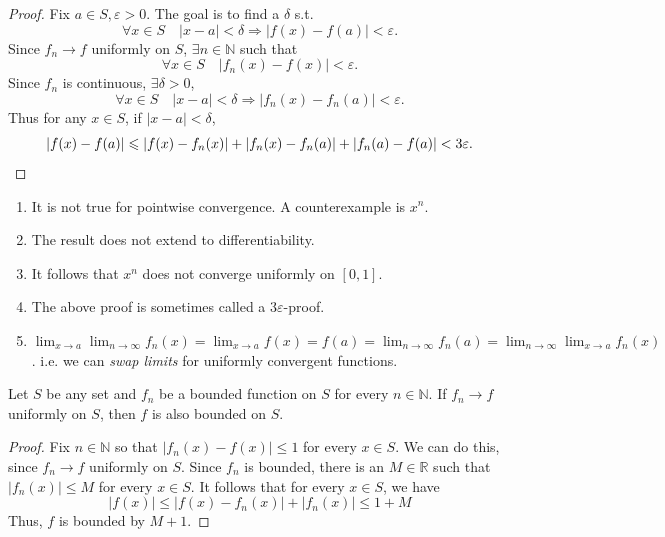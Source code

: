 \documentclass[a4paper,11pt]{article}
\renewcommand{\epsilon}{\varepsilon}
\begin{document}
\begin{proof}
    Fix $ a\in S, \epsilon>0 $. The goal is to find a $ \delta $ s.t. 
    \[
        \forall x\in S\quad |x-a|<\delta \Longrightarrow |f(x)-f(a)|<\epsilon.
    \]
    Since $ f_n\to f $ uniformly on $S$, $ \exists n\in \mathbb{N} $ such that 
    \[
        \forall x\in S\quad |f_n(x)-f(x)|<\epsilon.
    \]
    Since $f_n$ is continuous, $ \exists \delta>0 $, 
    \[
        \forall x\in S\quad |x-a|<\delta \Longrightarrow |f_n(x)-f_n(a)|<\epsilon.
    \]
    Thus for any $x\in S$, if $ |x-a|<\delta $,
    \[
        |f(x)-f(a)|\le |f(x)-f_n(x)|+|f_n(x)-f_n(a)|+|f_n(a)-f(a)|<3\epsilon.\qedhere
    \]
\end{proof}
\begin{remark}
    \begin{enumerate}
        \item It is not true for pointwise convergence. A counterexample is $x^n$.
        \item The result does not extend to differentiability.
        \item It follows that $x^{n}$ does not converge uniformly on $[0,1]$.
        \item The above proof is sometimes called a $3 \varepsilon$-proof.
        \item $\displaystyle \lim _{x \rightarrow a} \lim _{n \rightarrow \infty} f_{n}(x)=\lim _{x \rightarrow a} f(x)=f(a)=\lim _{n \rightarrow \infty} f_{n}(a)=\lim _{n \rightarrow \infty} \lim _{x \rightarrow a} f_{n}(x)$. i.e. we can \textit{swap limits} for uniformly convergent functions.
    \end{enumerate}
\end{remark}

\begin{lemma}\label{lemma 2}
    Let $S$ be any set and $f_{n}$ be a bounded function on $S$ for every $n \in \mathbb{N}$. If $f_{n} \rightarrow f$ uniformly on $S$, then $f$ is also bounded on $S$.
\end{lemma}
\begin{proof}
    Fix $n \in \mathbb{N}$ so that $\left|f_{n}(x)-f(x)\right| \leqslant 1$ for every $x \in S$. We can do this, since $f_{n} \rightarrow f$ uniformly on $S$. Since $f_{n}$ is bounded, there is an $M \in \mathbb{R}$ such that $\left|f_{n}(x)\right| \leqslant M$ for every $x \in S$. It follows that for every $x \in S$, we have
    \[
    |f(x)| \leqslant\left|f(x)-f_{n}(x)\right|+\left|f_{n}(x)\right| \leqslant 1+M
    \]
    Thus, $f$ is bounded by $M+1$.
\end{proof}
\end{document}
